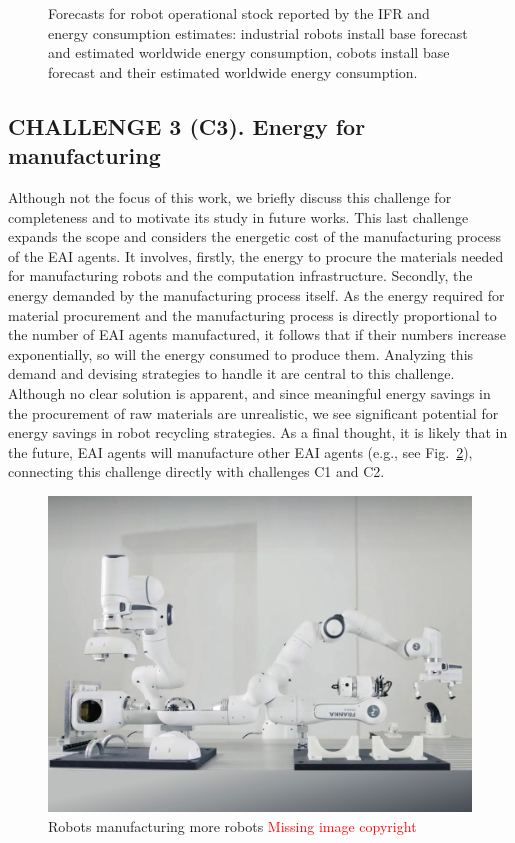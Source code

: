 \begin{figure}[!t]
	\hspace*{\fill}    
	\caption[] {\label{fig:robot_forecasts} Forecasts for robot operational stock reported by the IFR and energy consumption estimates:  industrial robots install base forecast and  estimated worldwide energy consumption,  cobots install base forecast and their  estimated worldwide energy consumption.}
\end{figure}

\subsection{\textbf{CHALLENGE 3} (C3). Energy for manufacturing}
Although not the focus of this work, we briefly discuss this challenge for completeness and to motivate its study in future works. This last challenge expands the scope and considers the energetic cost of the manufacturing process of the EAI agents. It involves, firstly, the energy to procure the materials needed for manufacturing robots and the computation infrastructure. Secondly, the energy demanded by the manufacturing process itself. As the energy required for material procurement and the manufacturing process is directly proportional to the number of EAI agents manufactured, it follows that if their numbers increase exponentially, so will the energy consumed to produce them. Analyzing this demand and devising strategies to handle it are central to this challenge. Although no clear solution is apparent, and since meaningful energy savings in the procurement of raw materials are unrealistic, we see significant potential for energy savings in robot recycling strategies. As a final thought, it is likely that in the future, EAI agents will manufacture other EAI agents (e.g., see Fig.~\ref{fig:franka_builds_franka}), connecting this challenge directly with challenges C1 and C2.
\begin{figure}[!t]
	\centering
	\includegraphics[width=0.75\columnwidth]{fig/franka_builds_franka.jpg}
	\caption{Robots manufacturing more robots \textcolor{red}{Missing image copyright}}
	\label{fig:franka_builds_franka}
\end{figure}

